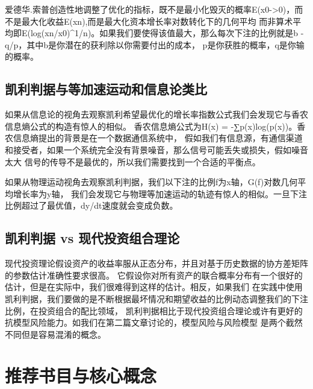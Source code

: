 \documentclass[
  oneside]{book}
\begin{document}
爱德华.索普创造性地调整了优化的指标，既不是最小化毁灭的概率E(x0-\textgreater0)，而不是最大化收益E(xn),而是最大化资本增长率对数转化下的几何平均
而非算术平均即E(log(xn/x0)\^{}1/n)。如果我们要使得该值最大，那么每次下注的比例就是b - q/p，其中b是你潜在的获利除以你需要付出的成本，
p是你获胜的概率，q是你输的概率。

\hypertarget{ux51efux5229ux5224ux636eux4e0eux7b49ux52a0ux901fux8fd0ux52a8ux548cux4fe1ux606fux8bbaux7c7bux6bd4}{%
\subsection{凯利判据与等加速运动和信息论类比}\label{ux51efux5229ux5224ux636eux4e0eux7b49ux52a0ux901fux8fd0ux52a8ux548cux4fe1ux606fux8bbaux7c7bux6bd4}}

如果从信息论的视角去观察凯利希望最优化的增长率指数公式我们会发现它与香农信息熵公式的构造有惊人的相似。
香农信息熵公式为H(x) = -∑p(x)log(p(x))。香农信息熵提出的背景是在一个数据通信系统中，
假如我们有信息源，有通信渠道和接受者，如果一个系统完全没有背景噪音，那么信号可能丢失或损失，假如噪音太大
信号的传导不是最优的，所以我们需要找到一个合适的平衡点。

如果从物理运动视角去观察凯利判据，我们以下注的比例f为x轴，G(f)对数几何平均增长率为y轴，
我们会发现它与物理等加速运动的轨迹有惊人的相似。一旦下注比例超过了最优值，dy/dt速度就会变成负数。

\hypertarget{ux51efux5229ux5224ux636e-vs-ux73b0ux4ee3ux6295ux8d44ux7ec4ux5408ux7406ux8bba}{%
\subsection{凯利判据 vs 现代投资组合理论}\label{ux51efux5229ux5224ux636e-vs-ux73b0ux4ee3ux6295ux8d44ux7ec4ux5408ux7406ux8bba}}

现代投资理论假设资产的收益率服从正态分布，并且对基于历史数据的协方差矩阵的参数估计准确性要求很高。
它假设你对所有资产的联合概率分布有一个很好的估计，但是在实际中，我们很难得到这样的估计。相反，如果我们
在实践中使用凯利判据，我们要做的是不断根据最坏情况和期望收益的比例动态调整我们的下注比例，在投资组合的配比领域，
凯利判据相比于现代投资组合理论或许有更好的抗模型风险能力。如我们在第二篇文章讨论的，模型风险与风险模型
是两个截然不同但是容易混淆的概念。

\hypertarget{ux63a8ux8350ux4e66ux76eeux4e0eux6838ux5fc3ux6982ux5ff5-1}{%
\section{推荐书目与核心概念}\label{ux63a8ux8350ux4e66ux76eeux4e0eux6838ux5fc3ux6982ux5ff5-1}}
\end{document}
